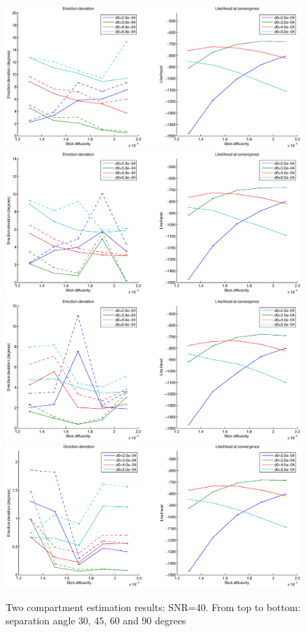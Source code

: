 \documentclass{article}
\begin{document}
\begin{enumerate}
\begin{figure}[H]
    \centering
    \includegraphics[width=\textwidth]{figures/two_fiber__snr=40__angle=30.eps}
    \includegraphics[width=\textwidth]{figures/two_fiber__snr=40__angle=45.eps}
    \includegraphics[width=\textwidth]{figures/two_fiber__snr=40__angle=60.eps}
    \includegraphics[width=\textwidth]{figures/two_fiber__snr=40__angle=90.eps}
    \caption{\label{figTwoFibers2}Two compartment estimation results: SNR=40. From top to bottom: separation angle 30, 45, 60 and 90 degrees}
\end{figure}


\end{enumerate}
\end{document}
